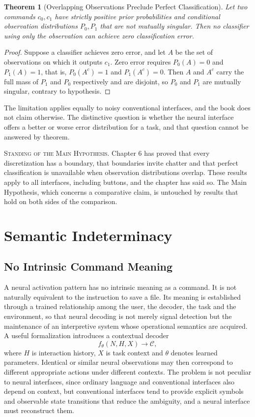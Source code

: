 \documentclass[11pt,twoside,openany]{book}
\newtheorem{theorem}{Theorem}[chapter]
\theoremstyle{definition}
\theoremstyle{remark}
\newcommand{\C}{\mathcal{C}}
\newenvironment{standing}{\par\medskip\noindent\hrulefill\par\smallskip\noindent\textsc{Standing of the Main Hypothesis.}\enspace}{\par\smallskip\noindent\hrulefill\par\medskip}
\begin{document}
\begin{theorem}[Overlapping Observations Preclude Perfect Classification]\label{thm:overlap}
Let two commands $c_0,c_1$ have strictly positive prior probabilities and conditional observation distributions $P_0,P_1$ that are not mutually singular. Then no classifier using only the observation can achieve zero classification error.
\end{theorem}
\begin{proof}
Suppose a classifier achieves zero error, and let $A$ be the set of observations on which it outputs $c_1$. Zero error requires $P_0(A)=0$ and $P_1(A)=1$, that is, $P_0(A^{c})=1$ and $P_1(A^{c})=0$. Then $A$ and $A^{c}$ carry the full mass of $P_1$ and $P_0$ respectively and are disjoint, so $P_0$ and $P_1$ are mutually singular, contrary to hypothesis.
\end{proof}

The limitation applies equally to noisy conventional interfaces, and the book does not claim otherwise. The distinctive question is whether the neural interface offers a better or worse error distribution for a task, and that question cannot be answered by theorem.

\begin{standing}
Chapter 6 has proved that every discretization has a boundary, that boundaries invite chatter and that perfect classification is unavailable when observation distributions overlap. These results apply to all interfaces, including buttons, and the chapter has said so. The Main Hypothesis, which concerns a comparative claim, is untouched by results that hold on both sides of the comparison.
\end{standing}

\chapter{Semantic Indeterminacy}

\section{No Intrinsic Command Meaning}

A neural activation pattern has no intrinsic meaning as a command. It is not naturally equivalent to the instruction to save a file. Its meaning is established through a trained relationship among the user, the decoder, the task and the environment, so that neural decoding is not merely signal detection but the maintenance of an interpretive system whose operational semantics are acquired. A useful formalization introduces a contextual decoder
\[
f_{\theta}(N,H,X)\longrightarrow\C,
\]
where $H$ is interaction history, $X$ is task context and $\theta$ denotes learned parameters. Identical or similar neural observations may then correspond to different appropriate actions under different contexts. The problem is not peculiar to neural interfaces, since ordinary language and conventional interfaces also depend on context, but conventional interfaces tend to provide explicit symbols and observable state transitions that reduce the ambiguity, and a neural interface must reconstruct them.
\end{document}
